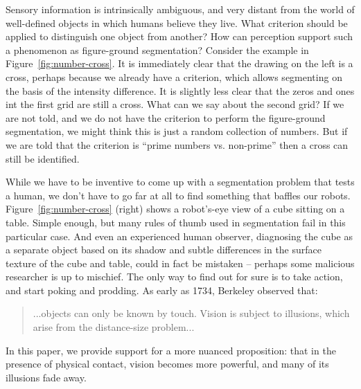 Sensory information is intrinsically ambiguous, and very distant from
the world of well-defined objects in which humans believe they live.  
What criterion should be applied to distinguish one object from
another?  How can perception support such a phenomenon as figure-ground
segmentation?  
Consider the example in Figure~\ref{fig:number-cross}.  It is
immediately clear that the drawing on the left is a cross, perhaps
because we already have a criterion, which allows segmenting on the
basis of the intensity difference. It is slightly less clear that the
zeros and ones int the first grid are still a cross. What can we say
about the second grid? If we are not told, and we do not have
the criterion to perform the figure-ground segmentation, we might
think this is just a random collection of numbers. But if we are told
that the criterion is ``prime numbers vs. non-prime'' then a cross can
still be identified.

While we have to be inventive to come up with a segmentation problem
that tests a human, we don't have to go far at all to find something
that baffles our robots.  Figure~\ref{fig:number-cross} (right) shows a
robot's-eye view of a cube sitting on a table.  Simple enough, but
many rules of thumb used in segmentation fail in this particular case.
And even an experienced human observer, diagnosing the cube as a
separate object based on its shadow and subtle differences in the
surface texture of the cube and table, could in fact be mistaken --
perhaps some malicious researcher is up to mischief.  The only way to
find out for sure is to take action, and start poking and prodding.
As early as 1734, Berkeley observed that:
%
\begin{quote}
...objects can only be known by
touch. Vision is subject to illusions, which arise from the
distance-size problem... \cite{berkeley72new}
\end{quote}
%
In this paper, we provide support for a more nuanced proposition: that
in the presence of physical contact, vision becomes more powerful, and many of
its illusions fade away.


